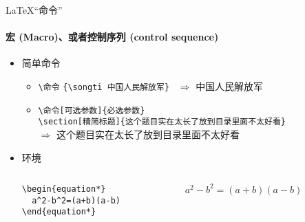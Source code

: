 \begin{frame}[fragile]{\LaTeX{}“命令”}
  \framesubtitle{宏 (Macro)、或者控制序列 (control sequence)}
  \begin{itemize}
    \item 简单命令
          \begin{itemize}
            \item \verb|\命令|\hspace{2em}
                  \verb|{\songti 中国人民解放军}| ~$\Rightarrow$ {\songti 中国人民解放军}
            \item \verb|\命令[可选参数]{必选参数}|\\
                  \verb|\section[精简标题]{这个题目实在太长了放到目录里面不太好看}|\\
                  $\Rightarrow$ { \hspace{1em} \songti
                      这个题目实在太长了放到目录里面不太好看}
          \end{itemize}
    \item 环境
          \begin{columns}[c]
            \begin{column}{0.45\textwidth}
              \begin{lstlisting}[basicstyle=\ttfamily]
\begin{equation*}
  a^2-b^2=(a+b)(a-b)
\end{equation*}
              \end{lstlisting}
            \end{column}\hspace{1em}
            \begin{column}{0.45\textwidth}
              $ a^2-b^2=(a+b)(a-b)$
            \end{column}
          \end{columns}
  \end{itemize}
\end{frame}

